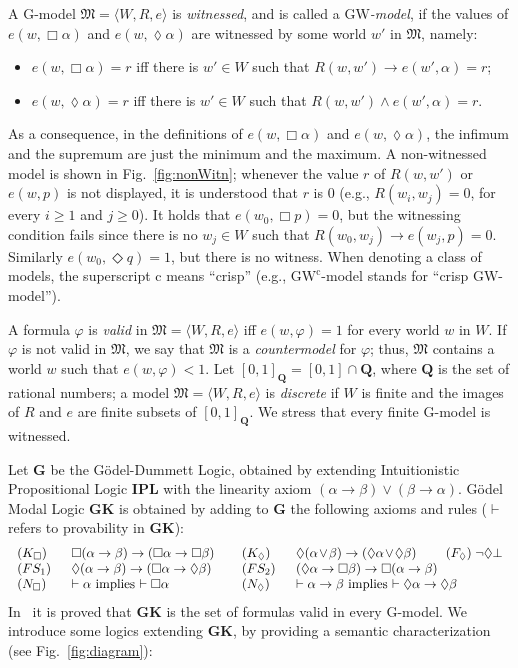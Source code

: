 \documentclass[copyright,creativecommons]{eptcs}
\newcommand{\GL}{\mathbf{G}}
\newcommand{\GKL}{\mathbf{GK}}
\newcommand{\GWCM}{\mbox{$\mathrm{GW}^\mathrm{c}$}}
\newcommand{\GM}{\mbox{$\mathrm{G}$}}
\newcommand{\GWM}{\mbox{$\mathrm{GW}$}}
\newcommand{\IPL}{\mathbf{IPL}\xspace}
\newcommand{\Diam}{\lozenge}
\newcommand{\Qrange}{[0,1]_{\mathbf{Q}}}
\newcommand{\stru}[1]{\langle #1 \rangle} %
\newcommand{\M}{\mathfrak{M}}
\renewcommand{\a}{\alpha}
\renewcommand{\b}{\beta}
\begin{document}
A \GM-model $\M=\stru{W,R,e}$ is \emph{witnessed}, and is called a
\emph{\GWM-model}, if the values of $e(w,\Box\a)$ and $e(w,\Diam\a)$
are witnessed by some world $w'$ in $\M$, namely:
\begin{itemize}
\item $e(w,\Box \a)=r$ iff there is $w'\in W$ such that $R(w,w') \to
  e(w',\a) = r$;

\item $e(w,\Diam \a)=r$ iff there is $w'\in W$ such that
  $R(w,w')\land e(w',\a) = r$.
\end{itemize}
As a consequence, in the definitions of $e(w,\Box \a)$ and $e(w,\Diam
\a)$, the infimum and the supremum are just the minimum and the
maximum. A non-witnessed model is shown in Fig.~\ref{fig:nonWitn};
whenever the value $r$ of $R(w,w')$ or $e(w,p)$ is not displayed, it
is understood that $r$ is 0 (e.g., $R(w_i,w_j)=0$, for every $i\geq 1$
and $j\geq 0$).  It holds that $e(w_0,\Box p)=0$, but the witnessing
condition fails since there is no $w_j\in W$ such that $R(w_0,w_j) \to
e(w_j,p)=0$.  Similarly $e(w_0,\Diamond q)=1$, but there is no
witness.  When denoting a class of models, the superscript
$\mathrm{c}$ means ``crisp'' (e.g., $\GWCM$-model stands for ``crisp
$\GWM$-model'').

A formula $\varphi$ is \emph{valid} in $\M=\stru{W,R,e}$ iff
$e(w,\varphi)=1$ for every world $w$ in $W$.  If $\varphi$ is not
valid in $\M$, we say that $\M$ is a \emph{countermodel} for
$\varphi$; thus, $\M$ contains a world $w$ such that $e(w,\varphi) <
1$.  Let $\Qrange=[0,1]\cap\mathbf{Q}$, where $\mathbf{Q}$ is the set
of rational numbers; a model $\M=\stru{W,R,e}$ is \emph{discrete} if
$W$ is finite and the images of $R$ and $e$ are finite subsets of
$\Qrange$. We stress that every finite \GM-model is witnessed.

Let $\GL$ be the G\"odel-Dummett Logic, obtained by extending
Intuitionistic Propositional Logic $\IPL$ with the linearity axiom
$(\a\to\b)\lor (\b\to \a)$.
G\"odel Modal Logic $\GKL$ is obtained by
adding to $\GL$ the following axioms and rules ($\vdash$ refers to
provability in $\GKL$):
\[
\begin{tabular}{m{3em}m{12em}m{3em}m{16em}}
  $(K_\Box)$ & $\Box(\a \to \b)\to (\Box\a\to \Box \b)$ & 
  $(K_\Diam)$ & $\Diam(\a \lor \b)\to (\Diam\a\lor \Diam \b)$
  \qquad $(F_\Diam)\; \neg \Diam\bot$ 
  \\
  $(FS_1)$ & $\Diam(\a \to \b)\to (\Box\a\to \Diam \b)$ & 
  $(FS_2)$ & $(\Diam \a \to\Box \b)\to \Box(\a\to  \b)$
  \\
  $(N_\Box)$ & $\vdash \a$ implies $\vdash \Box\a$ &
  $(N_\Diam)$ & $\vdash \a\to \b$ implies $\vdash \Diam \a\to\Diam\b$
\end{tabular}
\]
In~\cite{CaiRod2015} it is proved that $\GKL$ is the set of formulas
valid in every \GM-model.  We introduce some logics extending $\GKL$,
by providing a semantic characterization
(see Fig.~\ref{fig:diagram}):
\end{document}
